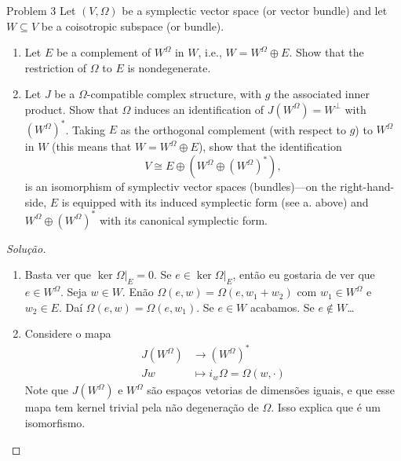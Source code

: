 \begin{idea5}{Problem 3}\leavevmode
Let $(V,\Omega)$ be a symplectic vector space (or vector bundle) and let $W\subseteq V$ be a coisotropic subspace (or bundle).
\begin{enumerate}[label=\alph*.]
	\item Let $E$ be a complement of $W^\Omega$ in $W$, i.e., $W=W^\Omega\oplus E$. Show that the restriction of $\Omega$ to $E$ is nondegenerate.
	\item Let $J$ be a $\Omega$-compatible complex structure, with $g$ the associated inner product. Show that $\Omega$ induces an identification of $J(W^\Omega)=W^\perp$ with $(W^\Omega)^*$. Taking $E$ as the orthogonal complement (with respect to $g$) to $W^\Omega$ in $W$ (this means that $W=W^\Omega\oplus E$), show that the identification
		\[V\cong E\oplus (W^\Omega\oplus (W^\Omega)^*),\]
		is an isomorphism of symplectiv vector spaces (bundles)---on the right-hand-side, $E$ is equipped with its induced symplectic form (see a. above) and $W^\Omega\oplus (W^\Omega)^*$  with its canonical symplectic form.
\end{enumerate}
\end{idea5}

\begin{proof}[Solução]\leavevmode 
\begin{enumerate}[label=\alph*.]
	\item 	Basta ver que $\ker \Omega|_{E}=0$. Se $e\in\ker \Omega|_{E}$, então eu gostaria de ver que $e\in W^\Omega$. Seja $w\in W$. Enão $\Omega(e,w)=\Omega(e,w_1+w_2)$ com $w_1\in W^\Omega$ e $w_2\in E$. Daí $\Omega(e,w)=\Omega(e,w_1)$. Se $e\in W$ acabamos. Se $e \notin W$…

	\item Considere o mapa
		\begin{align*}
			J(W^\Omega) &\longrightarrow (W^\Omega)^* \\
			Jw &\longmapsto i_w\Omega= \Omega(w,\cdot )
		\end{align*}
		Note que $J(W^\Omega)$ e $W^\Omega$ são espaços vetorias de dimensões iguais, e que esse mapa tem kernel trivial pela não degeneração de $\Omega$. Isso explica que é um isomorfismo.


		
\end{enumerate}
	
\end{proof}


